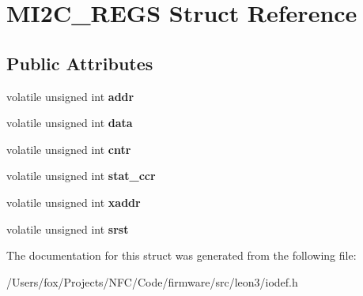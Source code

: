 \hypertarget{struct_m_i2_c___r_e_g_s}{
\section{MI2C\_\-REGS Struct Reference}
\label{struct_m_i2_c___r_e_g_s}
}
\subsection*{Public Attributes}
\begin{DoxyCompactItemize}
\item 
\hypertarget{struct_m_i2_c___r_e_g_s_a956e7a470f96e2405376f037a6945065}{
volatile unsigned int {\bfseries addr}}
\label{struct_m_i2_c___r_e_g_s_a956e7a470f96e2405376f037a6945065}

\item 
\hypertarget{struct_m_i2_c___r_e_g_s_a5bf308c9a422aa02f745f736d17c174d}{
volatile unsigned int {\bfseries data}}
\label{struct_m_i2_c___r_e_g_s_a5bf308c9a422aa02f745f736d17c174d}

\item 
\hypertarget{struct_m_i2_c___r_e_g_s_a6f263f7b68d69e30c4ac37cdaf700c39}{
volatile unsigned int {\bfseries cntr}}
\label{struct_m_i2_c___r_e_g_s_a6f263f7b68d69e30c4ac37cdaf700c39}

\item 
\hypertarget{struct_m_i2_c___r_e_g_s_aaa1385f75c8f29d99efb43ed37f2470b}{
volatile unsigned int {\bfseries stat\_\-ccr}}
\label{struct_m_i2_c___r_e_g_s_aaa1385f75c8f29d99efb43ed37f2470b}

\item 
\hypertarget{struct_m_i2_c___r_e_g_s_ac62f915e28276edbc52b3dc27268a9c7}{
volatile unsigned int {\bfseries xaddr}}
\label{struct_m_i2_c___r_e_g_s_ac62f915e28276edbc52b3dc27268a9c7}

\item 
\hypertarget{struct_m_i2_c___r_e_g_s_a296c1e0f22919ffd97eb604d52a7bf40}{
volatile unsigned int {\bfseries srst}}
\label{struct_m_i2_c___r_e_g_s_a296c1e0f22919ffd97eb604d52a7bf40}

\end{DoxyCompactItemize}


The documentation for this struct was generated from the following file:\begin{DoxyCompactItemize}
\item 
/Users/fox/Projects/NFC/Code/firmware/src/leon3/iodef.h\end{DoxyCompactItemize}
